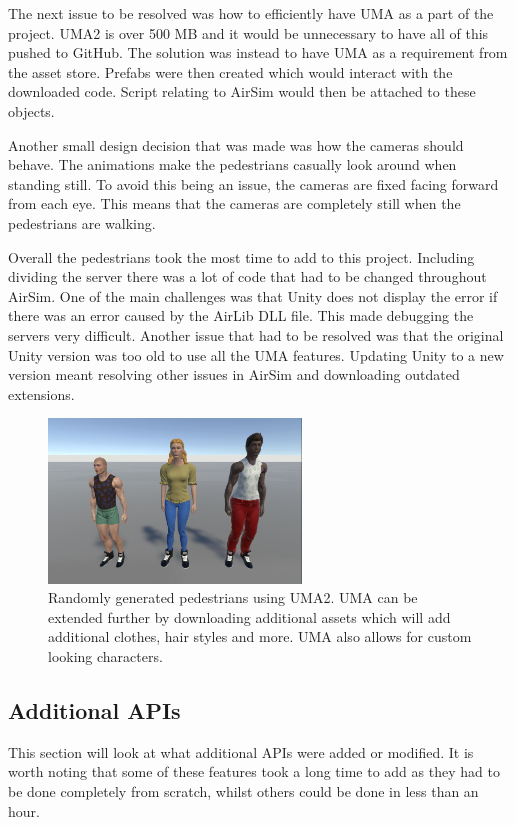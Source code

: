 The next issue to be resolved was how to efficiently have UMA as a part of the project. UMA2 is over 500 MB and it would be unnecessary to have all of this pushed to GitHub. The solution was instead to have UMA as a requirement from the asset store. Prefabs were then created which would interact with the downloaded code. Script relating to AirSim would then be attached to these objects. 

Another small design decision that was made was how the cameras should behave. The animations make the pedestrians casually look around when standing still. To avoid this being an issue, the cameras are fixed facing forward from each eye. This means that the cameras are completely still when the pedestrians are walking. 

Overall the pedestrians took the most time to add to this project. Including dividing the server there was a lot of code that had to be changed throughout AirSim. One of the main challenges was that Unity does not display the error if there was an error caused by the AirLib DLL file. This made debugging the servers very difficult. Another issue that had to be resolved was that the original Unity version was too old to use all the UMA features. Updating Unity to a new version meant resolving other issues in AirSim and downloading outdated extensions. 
\begin{figure}[H]
    \centering
    \includegraphics[width=0.6\textwidth]{06_Implementation/00_AirSim/Diagrams/RandomPedestrians.JPG}
    \caption{Randomly generated pedestrians using UMA2. UMA can be extended further by downloading additional assets which will add additional clothes, hair styles and more. UMA also allows for custom looking characters.} \label{06:umaCharacters}
\end{figure}

\subsection{Additional APIs}
This section will look at what additional APIs were added or modified.  It is worth noting that some of these features took a long time to add as they had to be done completely from scratch, whilst others could be done in less than an hour.

